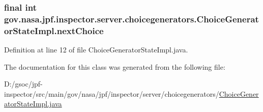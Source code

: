 \subsubsection[{\texorpdfstring{next\+Choice}{nextChoice}}]{\setlength{\rightskip}{0pt plus 5cm}final int gov.\+nasa.\+jpf.\+inspector.\+server.\+choicegenerators.\+Choice\+Generator\+State\+Impl.\+next\+Choice\hspace{0.3cm}{\ttfamily [private]}}\hypertarget{classgov_1_1nasa_1_1jpf_1_1inspector_1_1server_1_1choicegenerators_1_1_choice_generator_state_impl_ac8fb04c5a3d70c3f32cd001050019044}{}\label{classgov_1_1nasa_1_1jpf_1_1inspector_1_1server_1_1choicegenerators_1_1_choice_generator_state_impl_ac8fb04c5a3d70c3f32cd001050019044}


Definition at line 12 of file Choice\+Generator\+State\+Impl.\+java.



The documentation for this class was generated from the following file\+:\begin{DoxyCompactItemize}
\item 
D\+:/gsoc/jpf-\/inspector/src/main/gov/nasa/jpf/inspector/server/choicegenerators/\hyperlink{_choice_generator_state_impl_8java}{Choice\+Generator\+State\+Impl.\+java}\end{DoxyCompactItemize}
